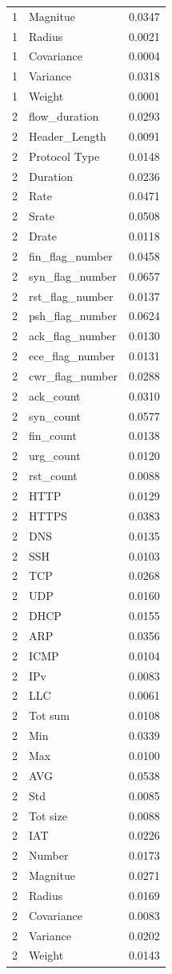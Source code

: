 \begin{tabular}{rlr}
1 & Magnitue & 0.0347 \\
1 & Radius & 0.0021 \\
1 & Covariance & 0.0004 \\
1 & Variance & 0.0318 \\
1 & Weight & 0.0001 \\
2 & flow\_duration & 0.0293 \\
2 & Header\_Length & 0.0091 \\
2 & Protocol Type & 0.0148 \\
2 & Duration & 0.0236 \\
2 & Rate & 0.0471 \\
2 & Srate & 0.0508 \\
2 & Drate & 0.0118 \\
2 & fin\_flag\_number & 0.0458 \\
2 & syn\_flag\_number & 0.0657 \\
2 & rst\_flag\_number & 0.0137 \\
2 & psh\_flag\_number & 0.0624 \\
2 & ack\_flag\_number & 0.0130 \\
2 & ece\_flag\_number & 0.0131 \\
2 & cwr\_flag\_number & 0.0288 \\
2 & ack\_count & 0.0310 \\
2 & syn\_count & 0.0577 \\
2 & fin\_count & 0.0138 \\
2 & urg\_count & 0.0120 \\
2 & rst\_count & 0.0088 \\
2 & HTTP & 0.0129 \\
2 & HTTPS & 0.0383 \\
2 & DNS & 0.0135 \\
2 & SSH & 0.0103 \\
2 & TCP & 0.0268 \\
2 & UDP & 0.0160 \\
2 & DHCP & 0.0155 \\
2 & ARP & 0.0356 \\
2 & ICMP & 0.0104 \\
2 & IPv & 0.0083 \\
2 & LLC & 0.0061 \\
2 & Tot sum & 0.0108 \\
2 & Min & 0.0339 \\
2 & Max & 0.0100 \\
2 & AVG & 0.0538 \\
2 & Std & 0.0085 \\
2 & Tot size & 0.0088 \\
2 & IAT & 0.0226 \\
2 & Number & 0.0173 \\
2 & Magnitue & 0.0271 \\
2 & Radius & 0.0169 \\
2 & Covariance & 0.0083 \\
2 & Variance & 0.0202 \\
2 & Weight & 0.0143 \\
\bottomrule
\end{tabular}
